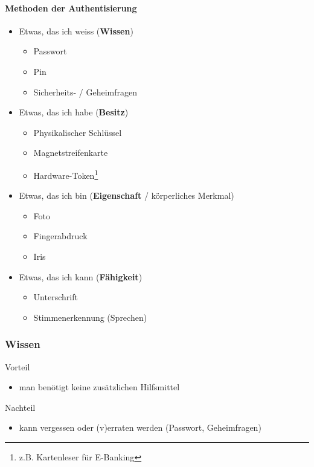 \documentclass[10pt,a4paper]{article}
\begin{document}
\paragraph*{Methoden der Authentisierung}
\begin{itemize}[noitemsep,topsep=0pt,leftmargin=*]
    \item Etwas, das ich weiss (\textbf{Wissen})
    \begin{itemize}[noitemsep,topsep=0pt,leftmargin=*]
        \item Passwort
        \item Pin
        \item Sicherheits- / Geheimfragen
    \end{itemize}
    \item Etwas, das ich habe (\textbf{Besitz})
    \begin{itemize}[noitemsep,topsep=0pt,leftmargin=*]
        \item Physikalischer Schlüssel
        \item Magnetstreifenkarte
        \item Hardware-Token\footnote{z.B. Kartenleser für E-Banking}
    \end{itemize}
    \item Etwas, das ich bin (\textbf{Eigenschaft} / körperliches Merkmal)
    \begin{itemize}[noitemsep,topsep=0pt,leftmargin=*]
        \item Foto
        \item Fingerabdruck
        \item Iris
    \end{itemize}
    \item Etwas, das ich kann (\textbf{Fähigkeit})
    \begin{itemize}[noitemsep,topsep=0pt,leftmargin=*]
        \item Unterschrift
        \item Stimmenerkennung (Sprechen)
    \end{itemize}
\end{itemize}

\subsubsection*{Wissen}
Vorteil
\begin{itemize}[noitemsep,topsep=0pt,leftmargin=*]
    \item man benötigt keine zusätzlichen Hilfsmittel
\end{itemize}
Nachteil
\begin{itemize}[noitemsep,topsep=0pt,leftmargin=*]
    \item kann vergessen oder (v)erraten werden (Passwort, Geheimfragen)
\end{itemize}
\end{document}
